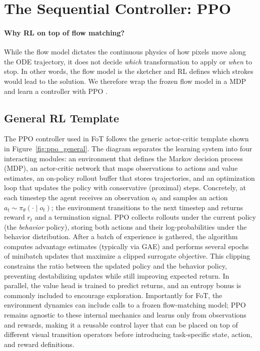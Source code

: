 \documentclass{l4proj}
\begin{document}
\section{The Sequential Controller: PPO}

\paragraph{Why RL on top of flow matching?}
While the flow model dictates the continuous physics of how pixels move along the ODE trajectory, it does not decide \emph{which} transformation to apply or \emph{when} to stop. In other words, the flow model is the sketcher and RL defines which strokes would lead to the solution. We therefore wrap the frozen flow model in a MDP and learn a controller with PPO \citep{schulman2017proximal}.

\subsection{General RL Template}
The PPO controller used in FoT follows the generic actor-critic template shown in Figure~\ref{fig:ppo_general}. The diagram separates the learning system into four interacting modules: an environment that defines the Markov decision process (MDP), an actor-critic network that maps observations to actions and value estimates, an on-policy rollout buffer that stores trajectories, and an optimization loop that updates the policy with conservative (proximal) steps. Concretely, at each timestep the agent receives an observation $o_t$ and samples an action $a_t \sim \pi_\theta(\cdot \mid o_t)$; the environment transitions to the next timestep and returns reward $r_t$ and a termination signal. PPO collects rollouts under the current policy (the \emph{behavior} policy), storing both actions and their log-probabilities under the behavior distribution. After a batch of experience is gathered, the algorithm computes advantage estimates (typically via GAE) and performs several epochs of minibatch updates that maximize a clipped surrogate objective. This clipping constrains the ratio between the updated policy and the behavior policy, preventing destabilizing updates while still improving expected return. In parallel, the value head is trained to predict returns, and an entropy bonus is commonly included to encourage exploration. Importantly for FoT, the environment dynamics can include calls to a frozen flow-matching model; PPO remains agnostic to these internal mechanics and learns only from observations and rewards, making it a reusable control layer that can be placed on top of different visual transition operators before introducing task-specific state, action, and reward definitions.
\end{document}
